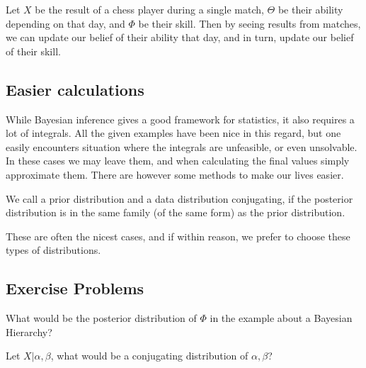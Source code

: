 \begin{example}
	Let \(X\) be the result of a chess player during a single match, \(\Theta \) be their ability depending on that day, and \(\Phi \) be their skill. Then by seeing results from matches, we can update our belief of their ability that day, and in turn, update our belief of their skill.
\end{example}

\subsection{Easier calculations}
While Bayesian inference gives a good framework for statistics, it also requires a lot of integrals. All the given examples have been nice in this regard, but one easily encounters situation where the integrals are unfeasible, or even unsolvable. In these cases we may leave them, and when calculating the final values simply approximate them. There are however some methods to make our lives easier.






\begin{definition}
	We call a prior distribution and a data distribution conjugating, if the posterior distribution is in the same family (of the same form) as the prior distribution.
\end{definition}

\begin{obs}
	These are often the nicest cases, and if within reason, we prefer to choose these types of distributions.
\end{obs}


\subsection{Exercise Problems}
\begin{problem}
	What would be the posterior distribution of \(\Phi \) in the example about a Bayesian Hierarchy?
\end{problem}


\begin{problem}
	Let \(X| \alpha , \beta \), what would be a conjugating distribution of \(\alpha, \beta \)? 
\end{problem}

